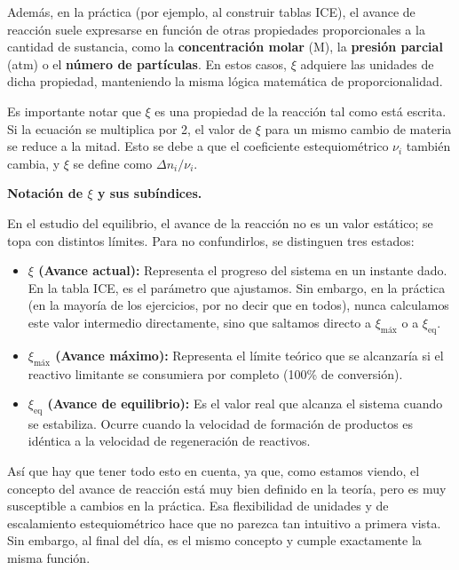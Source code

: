 Además, en la práctica (por ejemplo, al construir tablas ICE), el avance de reacción suele expresarse en función de otras propiedades proporcionales a la cantidad de sustancia, como la \textbf{concentración molar} (M), la \textbf{presión parcial} (atm) o el \textbf{número de partículas}. En estos casos, \(\xi\) adquiere las unidades de dicha propiedad, manteniendo la misma lógica matemática de proporcionalidad.

Es importante notar que \(\xi\) es una propiedad de la reacción
tal como está escrita. Si la ecuación se multiplica por 2, el
valor de \(\xi\) para un mismo cambio de materia se reduce a la
mitad. Esto se debe a que el coeficiente estequiométrico \(\nu_i\)
también cambia, y \(\xi\) se define como \(\Delta n_i / \nu_i\).

\medskip
\textbf{Notación de \(\xi\) y sus subíndices.}

En el estudio del equilibrio, el avance de la reacción no es un valor estático; se topa con distintos límites. Para no confundirlos, se distinguen tres estados:

\begin{itemize}
    \item \textbf{\(\xi\) (Avance actual):} Representa el progreso del sistema en un instante dado. En la tabla ICE, es el parámetro que ajustamos. Sin embargo, en la práctica (en la mayoría de los ejercicios, por no decir que en todos), nunca calculamos este valor intermedio directamente, sino que saltamos directo a \(\xi_{\text{máx}}\) o a \(\xi_{\text{eq}}\).
    
    \item \textbf{\(\xi_{\text{máx}}\) (Avance máximo):} Representa el límite teórico que se alcanzaría si el reactivo limitante se consumiera por completo (100\% de conversión). 
    
    \item \textbf{\(\xi_{\text{eq}}\) (Avance de equilibrio):} Es el valor real que alcanza el sistema cuando se estabiliza. Ocurre cuando la velocidad de formación de productos es idéntica a la velocidad de regeneración de reactivos.
\end{itemize}

\medskip
Así que hay que tener todo esto en cuenta, ya que, como estamos viendo, 
el concepto del avance de reacción está muy bien definido en la teoría, 
pero es muy susceptible a cambios en la práctica. Esa flexibilidad de unidades 
y de escalamiento estequiométrico hace que no parezca tan intuitivo a primera vista. 
Sin embargo, al final del día, es el mismo concepto y cumple exactamente la misma función.